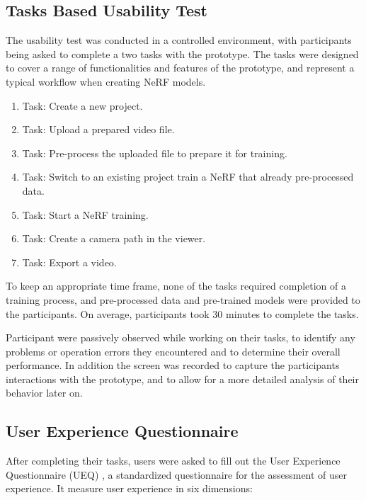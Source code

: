 \subsection{Tasks Based Usability Test}
\label{sec:methodology:study:tasks}

The usability test was conducted in a controlled environment, with participants being asked to complete a two tasks with the prototype.
The tasks were designed to cover a range of functionalities and features of the prototype, and represent a typical workflow when creating NeRF models.

\begin{enumerate}
  \item Task: Create a new project.
  \item Task: Upload a prepared video file.
  \item Task: Pre-process the uploaded file to prepare it for training.
  \item Task: Switch to an existing project train a NeRF that already pre-processed data.
  \item Task: Start a NeRF training.
  \item Task: Create a camera path in the viewer.
  \item Task: Export a video.
\end{enumerate}

To keep an appropriate time frame, none of the tasks required completion of a training process, and pre-processed data and pre-trained models were provided to the participants.
On average, participants took 30 minutes to complete the tasks. %

Participant were passively observed while working on their tasks, to identify any problems or operation errors they encountered and to determine their overall performance.
In addition the screen was recorded to capture the participants interactions with the prototype, and to allow for a more detailed analysis of their behavior later on.

\subsection{User Experience Questionnaire}
\label{sec:methodology:study:ueq}

After completing their tasks, users were asked to fill out the User Experience Questionnaire (UEQ) \cite{ueq}, a standardized questionnaire for the assessment of user experience.
It measure user experience in six dimensions:

